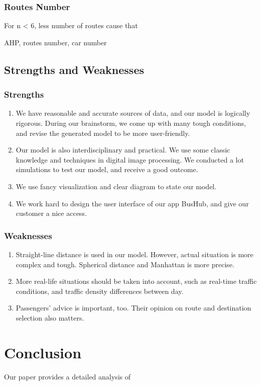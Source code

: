 \documentclass{mcmthesis}
\begin{document}
\subsubsection{Routes Number}
For n < 6, less number of routes  cause that 

AHP, routes number, car number

\subsection{Strengths and Weaknesses}
\subsubsection{Strengths}
\begin{enumerate}
    \item We have reasonable and accurate sources of data, and our model is logically rigorous. During our brainstorm, we come up with many tough conditions, and revise the generated model to be more user-friendly.
    \item Our model is also interdisciplinary and practical. We use some classic knowledge and techniques in digital image processing. We
    conducted a lot simulations to test our model, and receive a good outcome.
    \item We use fancy visualization and clear diagram to state our model.
    \item We work hard to design the user interface of our app BusHub, and give our customer a nice access.
\end{enumerate}

\subsubsection{Weaknesses}
\begin{enumerate}
    \item Straight-line distance is used in our model. However, actual situation is more complex and tough. Spherical distance and Manhattan is more precise. 
    \item More real-life situations should be taken into account, such as real-time traffic conditions, and traffic density differences between day.
    \item Passengers' advice is important, too. Their opinion on route and destination selection also matters.
\end{enumerate}

\section{Conclusion}\label{sec:conc}
Our paper provides a detailed analysis of
\end{document}
